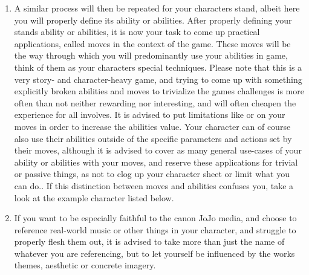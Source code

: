 \documentclass[a4paper,12pt]{article}
\begin{document}
\begin{enumerate}
		\item A similar process will then be repeated for your characters stand, albeit here you will properly define its ability or abilities. After properly defining your stands ability or abilities, it is now your task to come up practical applications, called moves in the context of the game. These moves will be the way through which you will predominantly use your abilities in game, think of them as your characters special techniques. Please note that this is a very story- and character-heavy game, and trying to come up with something explicitly broken abilities and moves to trivialize the games challenges is more often than not neither rewarding nor interesting, and will often cheapen the experience for all involves. It is advised to put limitations like  or  on your moves in order to increase the abilities value. Your character can of course also use their abilities outside of the specific parameters and actions set by their moves, although it is advised to cover as many general use-cases of your ability or abilities with your moves, and reserve these applications for trivial or passive things, as not to clog up your character sheet or limit what you can do.. If this distinction between moves and abilities confuses you, take a look at the example character listed below.
		\item If you want to be especially faithful to the canon JoJo media, and choose to reference real-world music or other things in your character, and struggle to properly flesh them out, it is advised to take more than just the name of whatever you are referencing, but to let yourself be influenced by the works themes, aesthetic or concrete imagery.
		
\end{enumerate}
\end{document}
